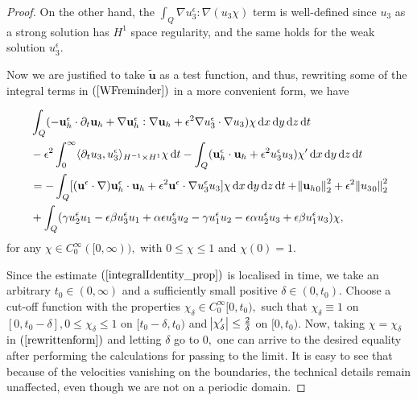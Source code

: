 \documentclass[11pt]{article}
\newcommand*\diff{\mathop{}\!\mathrm{d}}
\begin{document}
\begin{proof}
On the other hand, the $ \int_Q \nabla u^\epsilon_3 : \nabla (u_3 \chi) $ term is well-defined since $u_3$ as a strong solution has $H^1$ space regularity, and the same holds for the weak solution $u^\epsilon_3.$

Now we are justified to take $\tilde{\mathbf{u}}$ as a test function, and thus, rewriting some of the integral terms in $(\ref{WFreminder})$ in a more convenient form, we have

\begin{equation} \label{rewrittenform}
\begin{split}
& \int_Q (- \mathbf{u}_h^\epsilon \cdot \partial_t \mathbf{u}_h + \nabla \mathbf{u}_h^\epsilon : \nabla \mathbf{u}_h + \epsilon^2 \nabla u_3^\epsilon \cdot \nabla u_3) \chi \diff x \diff y \diff z \diff t \\
& - \epsilon^2 \int_0^\infty \langle \partial_t u_3 , u_3^\epsilon \rangle _{H^{-1} \times H^1} \chi \diff t - \int_Q (\mathbf{u}_h^\epsilon \cdot \mathbf{u}_h + \epsilon^2 u_3^\epsilon u_3) \chi' \diff x \diff y \diff z \diff t \\
& = - \int_Q [(\mathbf{u}^\epsilon \cdot \nabla) \mathbf{u}_h^\epsilon \cdot \mathbf{u}_h + \epsilon^2 \mathbf{u}^\epsilon \cdot \nabla u_3^\epsilon u_3] \chi \diff x \diff y \diff z \diff t + \norm{{\mathbf{u}_h}_0}_2^2 + \epsilon^2 \norm{{u_3}_0}_2^2 \\
& + \int_Q ( \gamma u_2^\epsilon u_1 - \epsilon \beta u_3^\epsilon u_1 + \alpha \epsilon u_3^\epsilon u_2 - \gamma u_1^\epsilon u_2 - \epsilon \alpha u^\epsilon_2 u_3 + \epsilon \beta u_1^\epsilon u_3) \chi,\raisetag{80pt}
\end{split}
\end{equation}
%
for any $\chi \in C^\infty_0 ([0,\infty)),$ with $0 \leq \chi \leq 1$ and $\chi (0) = 1.$

Since the estimate $(\ref{integralIdentity_prop})$ is localised in time, we take an arbitrary $t_0 \in (0, \infty)$ and a sufficiently small positive $\delta \in (0, t_0).$ Choose a cut-off function with the properties $\chi_\delta \in C^\infty_0 [0,t_0),$ such that $\chi_\delta \equiv 1$ on $[0, t_0 -\delta], 0 \leq \chi_\delta \leq 1$ on $[t_0 - \delta, t_0 )$ and $\abs{\chi_\delta '} \leq \frac{2}{\delta}$ on $[0, t_0).$ Now, taking $\chi = \chi_\delta$ in $(\ref{rewrittenform})$ and letting $\delta$ go to $0,$ one can arrive to the desired equality after performing the calculations for passing to the limit. It is easy to see that because of the velocities vanishing on the boundaries, the technical details remain unaffected, even though we are not on a periodic domain.


\end{proof}
\end{document}
